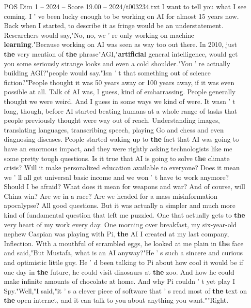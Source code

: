 \begin{textsample}{POS Dim 1 – 2024 – Score 19.00 – 2024/t003234.txt}  \label{ex:f1_pos_049}
I want to tell you what I see coming.
I ' ve been lucky enough to be working on AI for almost 15 years now.
Back when I started, to describe it as fringe would be an understatement.
Researchers would say,"No, no, we ' re only working on machine \textbf{learning}."Because working on AI was seen as way too out there.
In 2010, just \textbf{the} very mention of \textbf{the} phrase"AGI,"\textbf{artificial} general intelligence, would get you some seriously strange looks and even a cold shoulder."You ' re actually building AGI?"people would say."Isn ' t that something out of science fiction?"People thought it was 50 years away or 100 years away, if it was even possible at all.
Talk of AI was, I guess, kind of embarrassing.
People generally thought we were weird.
And I guess in some ways we kind of were.
It wasn ' t long, though, before AI started beating humans at a whole range of tasks that people previously thought were way out of reach.
Understanding images, translating languages, transcribing speech, playing Go and chess and even diagnosing diseases.
People started waking up to \textbf{the} fact that AI was going to have an enormous impact, and they were rightly asking technologists like me some pretty tough questions.
Is it true that AI is going to solve \textbf{the} climate crisis?
Will it make personalized education available to everyone?
Does it mean we ' ll all get universal basic income and we won ' t have to work anymore?
Should I be afraid?
What does it mean for weapons and war?
And of course, will China win?
Are we in a race?
Are we headed for a mass misinformation apocalypse?
All good questions.
But it was actually a simpler and much more kind of fundamental question that left me puzzled.
One that actually gets to \textbf{the} very heart of my work every day.
One morning over breakfast, my six-year-old nephew Caspian was playing with Pi, \textbf{the} AI I created at my last company, Inflection.
With a mouthful of scrambled eggs, he looked at me plain in \textbf{the} face and said,"But Mustafa, what is an AI anyway?"He ' s such a sincere and curious and optimistic little guy.
He ' d been talking to Pi about how cool it would be if one day in \textbf{the} future, he could visit dinosaurs at \textbf{the} zoo.
And how he could make infinite amounts of chocolate at home.
And why Pi couldn ' t yet play I Spy."Well,"I said,"it ' s a clever piece of software that ' s read most of \textbf{the} text on \textbf{the} open internet, and it can talk to you about anything you want.""Right.

\end{textsample}
